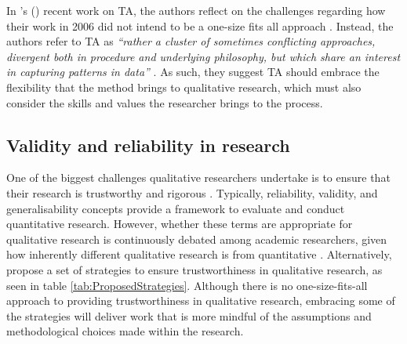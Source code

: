 In \citeauthor{braun_one_2020}'s (\citeyear{braun_one_2020}) recent work on TA, the authors reflect on the challenges regarding how their work in 2006 did not intend to be a one-size fits all approach \citep{braun_using_2006}. Instead, the authors refer to TA as \textit{``rather a cluster of sometimes conflicting approaches, divergent both in procedure and underlying philosophy, but which share an interest in capturing patterns in data''} \citep[p.333]{braun_one_2020}. As such, they suggest TA should embrace the flexibility that the method brings to qualitative research, which must also consider the skills and values the researcher brings to the process.

\subsection{Validity and reliability in research}
\label{TA:Reliability}
One of the biggest challenges qualitative researchers undertake is to ensure that their research is trustworthy and rigorous \citep{finlay2006rigour}. Typically, reliability, validity, and generalisability concepts provide a framework to evaluate and conduct quantitative research. However, whether these terms are appropriate for qualitative research is continuously debated among academic researchers, given how inherently different qualitative research is from quantitative \citep{ryan2009rigour}. Alternatively, \cite{noble2015issues} propose a set of strategies to ensure trustworthiness in qualitative research, as seen in table \ref{tab:ProposedStrategies}. Although there is no one-size-fits-all approach to providing trustworthiness in qualitative research, embracing some of the strategies will deliver work that is more mindful of the assumptions and methodological choices made within the research.  

